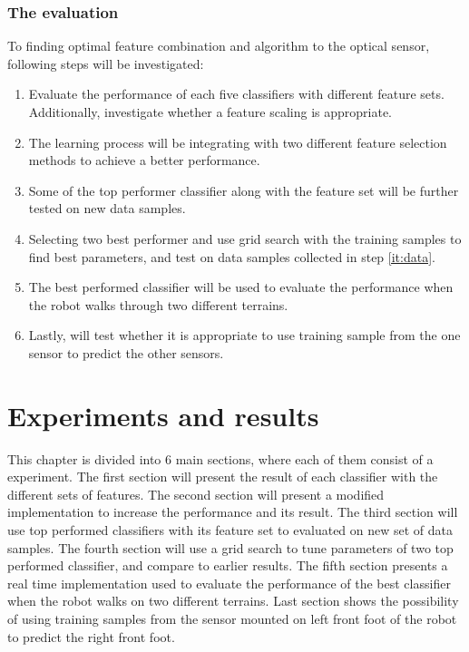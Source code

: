 \documentclass[USenglish]{ifimaster}  %
\begin{document}
\clearpage
\subsection{The evaluation}
To finding optimal feature combination and algorithm to the optical sensor, following steps will be investigated:

\begin{enumerate}
	\item Evaluate the performance of each five classifiers with different feature sets. Additionally, investigate whether a feature scaling is appropriate.  
	\item The learning process will be integrating with two different feature selection methods to achieve a better performance. 
	\item \label{it:data} Some of the top performer classifier along with the feature set will be further tested on new data samples.
	\item Selecting two best performer and use grid search with the training samples to find best parameters, and test on data samples collected in step \ref{it:data}.
	\item The best performed classifier will be used to evaluate the performance when the robot walks through two different terrains.
	\item Lastly, will test whether it is appropriate to use training sample from the one sensor to predict the other sensors. 
\end{enumerate}


\chapter{Experiments and results}                     %
This chapter is divided into 6 main sections, where each of them consist of a experiment. The first section will present the result of each classifier with the different sets of features. The second section will present a modified implementation to increase the performance and its result. The third section will use top performed classifiers with its feature set to evaluated on new set of data samples. The fourth section will use a grid search to tune parameters of two top performed classifier, and compare to earlier results. The fifth section presents a real time implementation used to evaluate the performance of the best classifier when the robot walks on two different terrains. Last section shows the possibility of using training samples from the sensor mounted on left front foot of the robot to predict the right front foot.
 
\end{document}
